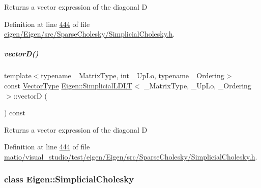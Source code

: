 \begin{DoxyReturn}{Returns}
a vector expression of the diagonal D 
\end{DoxyReturn}


Definition at line \hyperlink{eigen_2_eigen_2src_2_sparse_cholesky_2_simplicial_cholesky_8h_source_l00444}{444} of file \hyperlink{eigen_2_eigen_2src_2_sparse_cholesky_2_simplicial_cholesky_8h_source}{eigen/\+Eigen/src/\+Sparse\+Cholesky/\+Simplicial\+Cholesky.\+h}.

\mbox{\label{group___sparse_cholesky___module_abe54532ce80558a0474b11763702107b}} 
\subparagraph{\texorpdfstring{vector\+D()}{vectorD()}\hspace{0.1cm}{\footnotesize\ttfamily [2/2]}}
{\footnotesize\ttfamily template$<$typename \+\_\+\+Matrix\+Type, int \+\_\+\+Up\+Lo, typename \+\_\+\+Ordering$>$ \\
const \hyperlink{group___core___module}{Vector\+Type} \hyperlink{group___sparse_cholesky___module_class_eigen_1_1_simplicial_l_d_l_t}{Eigen\+::\+Simplicial\+L\+D\+LT}$<$ \+\_\+\+Matrix\+Type, \+\_\+\+Up\+Lo, \+\_\+\+Ordering $>$\+::vectorD (\begin{DoxyParamCaption}{ }\end{DoxyParamCaption}) const\hspace{0.3cm}{\ttfamily [inline]}}

\begin{DoxyReturn}{Returns}
a vector expression of the diagonal D 
\end{DoxyReturn}


Definition at line \hyperlink{matio_2visual__studio_2test_2eigen_2_eigen_2src_2_sparse_cholesky_2_simplicial_cholesky_8h_source_l00444}{444} of file \hyperlink{matio_2visual__studio_2test_2eigen_2_eigen_2src_2_sparse_cholesky_2_simplicial_cholesky_8h_source}{matio/visual\+\_\+studio/test/eigen/\+Eigen/src/\+Sparse\+Cholesky/\+Simplicial\+Cholesky.\+h}.

\label{class_eigen_1_1_simplicial_cholesky}
\subsubsection{class Eigen\+:\+:Simplicial\+Cholesky}
